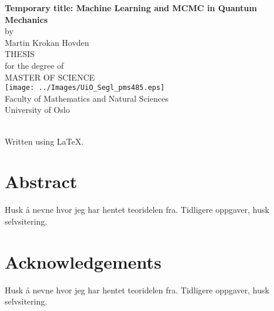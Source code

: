 \thispagestyle{empty}
\begin{center} \vspace{1cm}
    \textbf{\Large{Temporary title: Machine Learning and MCMC in Quantum Mechanics}}\\ \vspace{0.5cm}
    \small{by}\\ \vspace{0.5cm}
    \large{Martin Krokan Hovden}\\ \vspace{4.4cm}
    \large{THESIS}\\ \vspace{0.3cm}
    \small{for the degree of}\\ \vspace{0.3cm}
    \large{MASTER OF SCIENCE}\\ \vspace{0.7cm}
    \texttt{[image: ../Images/UiO\_Segl\_pms485.eps]} \\ \vspace{0.5cm}
    \large{Faculty of Mathematics and Natural Sciences \\ University of Oslo} \\ \vspace{0.5cm}
    \small{\mdate}\\ \vfill
\end{center}
\newpage
\vspace*{\fill}
{\setlength{\parindent}{0cm}

Written using \LaTeX.}
 
\newpage
\section*{Abstract}
Husk å nevne hvor jeg har hentet teoridelen fra. Tidligere oppgaver, husk selvsitering. 

\thispagestyle{empty}
\cleardoublepage

\section*{Acknowledgements}
Husk å nevne hvor jeg har hentet teoridelen fra. Tidligere oppgaver, husk selvsitering. 


\thispagestyle{empty}
\cleardoublepage

\newpage

{%
    \tableofcontents
    \thispagestyle{empty}
    \clearpage}%

\thispagestyle{empty}
\clearpage

